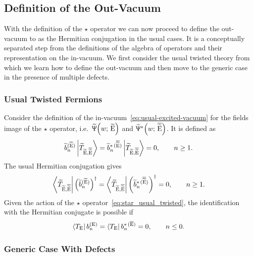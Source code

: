 \subsection{Definition of the Out-Vacuum}
\label{sec:out-vacuum}

With the definition of the $\star$ operator we can now proceed to define the out-vacuum to as the Hermitian conjugation in the usual cases.
It is a conceptually separated step from the definitions of the algebra of operators and their representation on the in-vacuum.
We first consider the usual twisted theory from which we learn how to define the out-vacuum and then move to the generic case in the presence of multiple defects.


\subsubsection{Usual Twisted Fermions}

Consider the definition of the in-vacuum~\eqref{eq:usual-excited-vacuum} for the fields image of the $\star$ operator, i.e.\ $\widetilde{\Uppsi}\qty( w;\, \widetilde{\mathrm{E}} )$ and $\widetilde{\Uppsi}^*\qty( w;\, \overline{\widetilde{\mathrm{E}}} )$.
It is defined as
\begin{equation}
  \widetilde{b}^{( \widetilde{\mathrm{E}} )}_n \ket{\widetilde{T}_{\widetilde{\mathrm{E}} ,\overline{\widetilde{\mathrm{E}}}}}
  = 
  \widetilde{b}^{*\, ( \overline{\widetilde{\mathrm{E}}} )}_n \ket{\widetilde{T}_{\widetilde{\mathrm{E}} ,\overline{\widetilde{\mathrm{E}}}}}
  = 0,
  \qquad
  n \ge 1.
\end{equation}
The usual Hermitian conjugation gives
\begin{equation}
  \bra{\widetilde{T}_{\widetilde{\mathrm{E}} ,\overline{\widetilde{\mathrm{E}}}}}
  \qty( \widetilde{b}^{( \widetilde{\mathrm{E}} )}_n)^\dagger 
  = 
  \bra{\widetilde{T}_{\widetilde{\mathrm{E}} ,\overline{\widetilde{\mathrm{E}}}}}
  \qty( \widetilde{b}^{*\, ( \overline{\widetilde{\mathrm{E}}} )}_n)^\dagger 
  = 0,
  \qquad
  n \ge 1.
\end{equation}
Given the action of the $\star$ operator~\eqref{eq:star_usual_twisted}, the identification with the Hermitian conjugate is possible if
\begin{equation}
  \bra{T_{\mathrm{E}}} b^{(\mathrm{E})}_n = \bra{T_{\mathrm{E}}} b^{*\, ( \overline{\mathrm{E}} )}_n = 0,
  \qquad
  n \le 0.
\end{equation}


\subsubsection{Generic Case With Defects}

